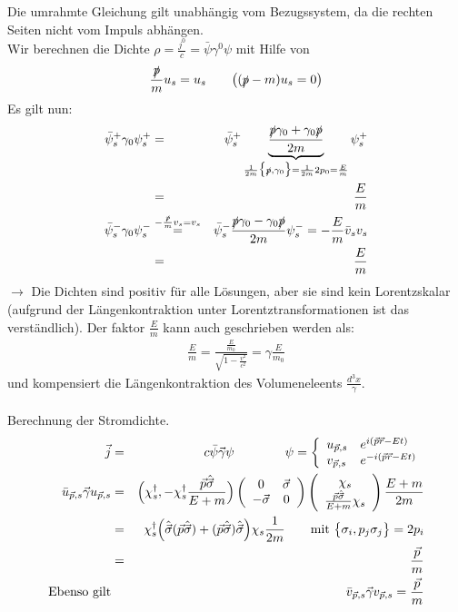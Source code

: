 Die umrahmte Gleichung gilt unabhängig vom Bezugssystem, da die rechten Seiten nicht vom Impuls abhängen.\\
Wir berechnen die Dichte $\rho = \frac{j^0}c = \bar \psi \gamma^0 \psi$ mit Hilfe von
\begin{eqnarray*}
\frac{\slashed p}mu_s = u_s \qquad \big((\slashed p - m) u_s = 0 \big)
\end{eqnarray*}
Es gilt nun:
\begin{eqnarray*}
\bar \psi_s^+ \gamma_0\psi_s^+ &=& \bar\psi_s^+ \underbrace{\frac{\slashed p \gamma_0+\gamma_0\slashed p}{2m}}_{\frac 1 {2m}\big\{\slashed p , \gamma_0\big\} = \frac 1{2m}2p_0=\frac E m} \psi^+_s \\ &=& \frac E m\\
\bar \psi^-_s\gamma_0\psi^-_s &\overset{-\frac{\slashed p} m v_s = v_s}=&\bar \psi^-_s \frac{\slashed p \gamma_0-\gamma_0\slashed p}{2m}\psi_s^- =-\frac E m\bar v_s v_s \\ &=& \frac E m
\end{eqnarray*}
$\longrightarrow$ Die Dichten sind positiv für alle Lösungen, aber sie sind kein Lorentzskalar (aufgrund der Längenkontraktion unter Lorentztransformationen ist das verständlich). Der faktor $\frac E m$ kann auch geschrieben werden als:
\begin{eqnarray*}
\frac E m = \frac {\frac E {m_0}} {\sqrt{1 - \frac {v^2}{c^2}}} = \gamma \frac E {m_0}
\end{eqnarray*}
und kompensiert die Längenkontraktion des Volumeneleents $\frac{d^3x}  \gamma$.\\
\\
Berechnung der Stromdichte.
\begin{eqnarray*}
\vec j &=& c \bar \psi\vec \gamma \psi \qquad\qquad \psi = \left \{ \begin{array}{ll} u_{\vec p,s}&e^{i(\vec p\vec r-Et)}\\v_{\vec p,s}&e^{-i(\vec p\vec r-Et)}\end{array}\right.\\
\bar u_{\vec p,s}\vec \gamma u _{\vec p,s}&=& \Big(\chi^\dagger_{s}, -\chi_s^\dagger \frac{\vec p\hat{\vec\sigma}}{E+m}\Big) \left(\begin{array}{cc}0 &\vec \sigma\\-\vec \sigma&0\end{array}\right )\left(\begin{array}{c} \chi_s\\ \frac{\vec p\hat{\vec \sigma}}{E+m}\chi_s\end{array}\right ) \frac{E+m}{2m}\\
&=& \chi^\dagger_s \Big(\hat{\vec\sigma}(\vec p \hat{\vec \sigma}) + (\vec p \hat{\vec \sigma})\hat{\vec \sigma}\Big) \chi_s \frac1 {2m}\qquad \text{mit }\big\{\sigma_i,p_j\sigma_j\big\} = 2p_i\\
&=& \frac{\vec p}m\\
\text{Ebenso gilt}&{}& \bar v_{\vec p,s}\vec \gamma v_{\vec p,s} = \frac{\vec p}m
\end{eqnarray*}
